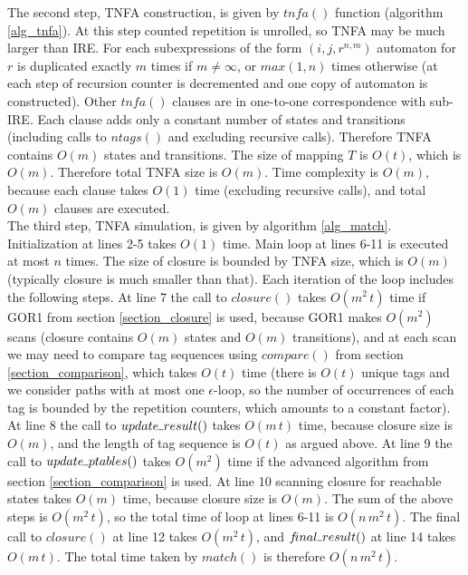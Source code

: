 \documentclass[AMA,STIX1COL]{WileyNJD-v2}
\newcommand{\Xund}{\rule{.4em}{.4pt}}
\begin{document}
The second step, TNFA construction, is given by $tn\!f\!a()$ function (algorithm \ref{alg_tnfa}).
At this step counted repetition is unrolled, so TNFA may be much larger than IRE.
For each subexpressions of the form $(i, j, r^{n,m})$ automaton for $r$ is duplicated exactly $m$ times if $m \neq \infty$, or $max(1, n)$ times otherwise
(at each step of recursion counter is decremented and one copy of automaton is constructed).
Other $tn\!f\!a()$ clauses are in one-to-one correspondence with sub-IRE.
Each clause adds only a constant number of states and transitions (including calls to $ntags()$ and excluding recursive calls).
Therefore TNFA contains $O(m)$ states and transitions.
The size of mapping $T$ is $O(t)$, which is $O(m)$.
Therefore total TNFA size is $O(m)$.
Time complexity is $O(m)$, because each clause takes $O(1)$ time (excluding recursive calls), and total $O(m)$ clauses are executed.
\\

The third step, TNFA simulation, is given by algorithm \ref{alg_match}.
Initialization at lines 2-5 takes $O(1)$ time.
Main loop at lines 6-11 is executed at most $n$ times.
The size of closure is bounded by TNFA size, which is $O(m)$ (typically closure is much smaller than that).
Each iteration of the loop includes the following steps.
%
At line 7 the call to $closure()$ takes $O(m^2 \, t)$ time if GOR1 from section \ref{section_closure} is used,
because GOR1 makes $O(m^2)$ scans (closure contains $O(m)$ states and $O(m)$ transitions),
and at each scan we may need to compare tag sequences using $compare()$ from section \ref{section_comparison},
which takes $O(t)$ time
(there is $O(t)$ unique tags and we consider paths with at most one $\epsilon$-loop,
so the number of occurrences of each tag is bounded by the repetition counters,
which amounts to a constant factor).
%
At line 8 the call to $update \Xund result()$ takes $O(m \, t)$ time,
because closure size is $O(m)$,
and the length of tag sequence is $O(t)$ as argued above.
%
At line 9 the call to $update \Xund ptables ()$ takes $O(m^2)$ time
if the advanced algorithm from section \ref{section_comparison} is used.
%
At line 10 scanning closure for reachable states takes $O(m)$ time,
because closure size is $O(m)$.
%
The sum of the above steps is $O(m^2 \, t)$, so the total time of loop at lines 6-11 is $O(n \, m^2 \, t)$.
The final call to $closure()$ at line 12 takes $O(m^2 \, t)$,
and $f\!inal \Xund result ()$ at line 14 takes $O(m \, t)$.
The total time taken by $match()$ is therefore $O(n \, m^2 \, t)$.
\\
\end{document}
